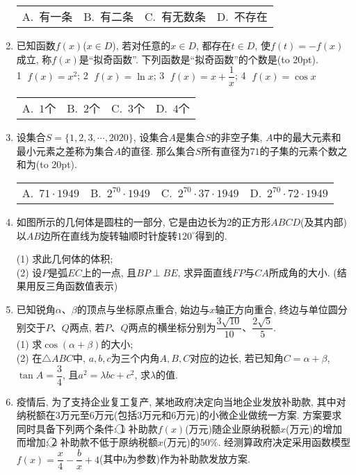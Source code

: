 \documentclass[10pt,a4paper]{article}
\newcommand{\bracket}[1]{(\hbox to #1pt{})}
\newcommand{\fourch}[4]{\par\begin{tabular}{p{.23\textwidth}p{.23\textwidth}p{.23\textwidth}p{.23\textwidth}}
A.~#1 &B.~#2& C.~#3& D.~#4
\end{tabular}}
\begin{document}
\begin{enumerate}[1.]
\fourch{有一条}{有二条}{有无数条}{不存在}
\item 已知函数$f(x)$($x\in D$), 若对任意的$x\in D$, 都存在$t\in D$, 使$f(t)=-f(x)$成立, 称$f(x)$是``拟奇函数''. 下列函数是``拟奇函数''的个数是\bracket{20}.\\
\textcircled{1} $f(x)=x^2$;  \textcircled{2} $f(x)=\ln x$;  \textcircled{3} $f(x)=x+\dfrac 1x$;  \textcircled{4} $f(x)=\cos x$
\fourch{$1$个}{$2$个}{$3$个}{$4$个}
\item 设集合$S=\{1,2,3,\cdots,2020\}$, 设集合$A$是集合$S$的非空子集, $A$中的最大元素和最小元素之差称为集合$A$的直径. 那么集合$S$所有直径为$71$的子集的元素个数之和为\bracket{20}.
\fourch{$71\cdot 1949$}{$2^{70}\cdot 1949$}{$2^{70}\cdot 37\cdot 1949$}{$2^{70}\cdot 72\cdot 1949$}
\item 如图所示的几何体是圆柱的一部分, 它是由边长为$2$的正方形$ABCD$(及其内部)以$AB$边所在直线为旋转轴顺时针旋转$120^{\circ}$得到的.
\begin{center}
\end{center}
(1) 求此几何体的体积;\\
(2) 设$P$是弧$EC$上的一点, 且$BP\perp BE$, 求异面直线$FP$与$CA$所成角的大小. (结果用反三角函数值表示)
\item 已知锐角$\alpha$、$\beta$的顶点与坐标原点重合, 始边与$x$轴正方向重合, 终边与单位圆分别交于$P$、$Q$两点, 若$P$、$Q$两点的横坐标分别为$\dfrac{3\sqrt {10}}{10}$、$\dfrac{2\sqrt 5}5$.\\
(1) 求$\cos (\alpha +\beta)$的大小;\\
(2) 在$\triangle ABC$中, $a,b,c$为三个内角$A,B,C$对应的边长, 若已知角$C=\alpha +\beta$, $\tan A=\dfrac 34$, 且$a^2=\lambda bc+c^2$, 求$\lambda$的值.
\item 疫情后, 为了支持企业复工复产, 某地政府决定向当地企业发放补助款, 其中对纳税额在$3$万元至$6$万元(包括$3$万元和$6$万元)的小微企业做统一方案. 方案要求同时具备下列两个条件: \textcircled{1} 补助款$f(x)$(万元)随企业原纳税额$x$(万元)的增加而增加; \textcircled{2} 补助款不低于原纳税额$x$(万元)的$50\%$. 经测算政府决定采用函数模型$f(x)=\dfrac x4-\dfrac bx+4$(其中$b$为参数)作为补助款发放方案.\\

\end{enumerate}
\end{document}

